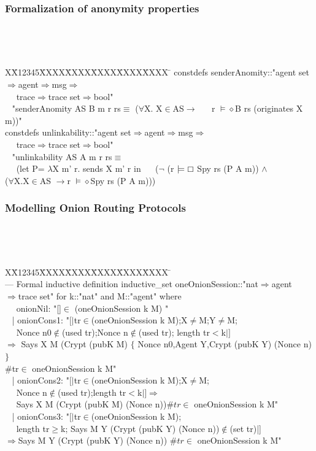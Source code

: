 \documentclass{beamer}
\newlength{\fminilength}
\newenvironment{fmini}[1][\linewidth]
  {\setlength{\fminilength}{#1\fboxsep-2\fboxrule}%
   \vspace{2ex}\noindent\begin{lrbox}{\fminibox}\begin{minipage}{\fminilength}%
   \mbox{ }\hfill\vspace{-2.5ex}}%
  {\end{minipage}\end{lrbox}\vspace{1ex}\hspace{0ex}%
   \framebox{\usebox{\fminibox}}}
\newenvironment{specification}
{\noindent\scriptsize
\tt\begin{fmini}\begin{tabbing}X\=X12345\=XXXX\=XXXX\=XXXX\=XXXX\=XXXX
\=\+\kill} {\end{tabbing}\normalfont\end{fmini}}
\begin{document}
\begin{frame}\frametitle{Formalization of anonymity properties}

\begin{specification}
constdefs senderAnomity::"agent set$\Rightarrow$agent$\Rightarrow$msg$\Rightarrow$\\
~~ trace$\Rightarrow$trace set$\Rightarrow$bool" \\
~ "senderAnomity AS B m r rs$\equiv$ ($\forall$X. X$\in$AS$\longrightarrow$
~~ r $\models \diamond$B rs (originates X m))"\\



constdefs unlinkability::"agent set$\Rightarrow$agent$\Rightarrow$msg$\Rightarrow$ \\
~~ trace$\Rightarrow$trace set$\Rightarrow$bool" \\
~ "unlinkability AS A m r rs$\equiv$  \\
~~ (let P= $\lambda$X m' r. sends X m' r  in
~~ ($\neg$ (r $\models \boxempty$ Spy rs (P A m)) $\wedge$  \\
  ($\forall$X.X$\in$AS $\longrightarrow$r
$\models \diamond$Spy rs (P A m)))\\


\end{specification}

\end{frame}


\begin{frame}\frametitle{Modelling Onion Routing Protocols}
\begin{specification}
\\ --- Formal inductive definition
inductive\_set oneOnionSession::"nat$\Rightarrow$agent\\ $\Rightarrow$trace set"
for k::"nat" and M::"agent" where \\
~ ~onionNil: "[]$\in$ (oneOnionSession k M) " \\
~ | onionCons1: "$[|$tr$\in$(oneOnionSession k M);X$\ne$M;Y$\ne$M;\\
~~ Nonce n0$\notin$(used tr);Nonce n$\notin$(used tr); length tr$<$k$|]$\\
$\Longrightarrow$  Says X M (Crypt (pubK M) $ \{$ Nonce n0,Agent Y,Crypt (pubK Y) (Nonce n)$\}$ \\
 $\#$tr$\in$ oneOnionSession k M"\\

 ~ | onionCons2: "$[|$tr$\in$(oneOnionSession k M);X$\ne$M; \\
~~ Nonce n$\notin$(used  tr);length tr$<$k$|]$$\Longrightarrow$\\
~~ Says X M (Crypt (pubK M) (Nonce n))$ \#tr\in$ oneOnionSession k M"\\

~ | onionCons3: "$[|$tr$\in$(oneOnionSession k M);\\
~~ length tr$\ge$k;  Says M Y (Crypt (pubK Y) (Nonce n))$\notin$(set tr)|]\\
 $\Longrightarrow$Says M Y (Crypt (pubK Y) (Nonce n))
$ \#tr\in$ oneOnionSession k M"
\end{specification}
\end{frame}
\end{document}
